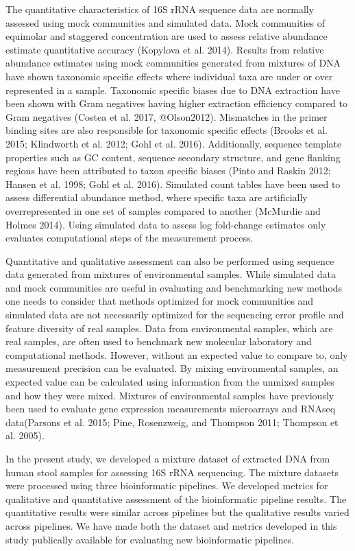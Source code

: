\documentclass[smallextended]{svjour3}       %
\begin{document}
The quantitative characteristics of 16S rRNA sequence data are normally
assessed using mock communities and simulated data. Mock communities of
equimolar and staggered concentration are used to assess relative
abundance estimate quantitative accuracy (Kopylova et al. 2014). Results
from relative abundance estimates using mock communities generated from
mixtures of DNA have shown taxonomic specific effects where individual
taxa are under or over represented in a sample. Taxonomic specific
biases due to DNA extraction have been shown with Gram negatives having
higher extraction efficiency compared to Gram negatives (Costea et al.
2017, @Olson2012). Mismatches in the primer binding sites are also
responsible for taxonomic specific effects (Brooks et al. 2015;
Klindworth et al. 2012; Gohl et al. 2016). Additionally, sequence
template properties such as GC content, sequence secondary structure,
and gene flanking regions have been attributed to taxon specific biases
(Pinto and Raskin 2012; Hansen et al. 1998; Gohl et al. 2016). Simulated
count tables have been used to assess differential abundance method,
where specific taxa are artificially overrepresented in one set of
samples compared to another (McMurdie and Holmes 2014). Using simulated
data to assess log fold-change estimates only evaluates computational
steps of the measurement process.

Quantitative and qualitative assessment can also be performed using
sequence data generated from mixtures of environmental samples. While
simulated data and mock communities are useful in evaluating and
benchmarking new methods one needs to consider that methods optimized
for mock communities and simulated data are not necessarily optimized
for the sequencing error profile and feature diversity of real samples.
Data from environmental samples, which are real samples, are often used
to benchmark new molecular laboratory and computational methods.
However, without an expected value to compare to, only measurement
precision can be evaluated. By mixing environmental samples, an expected
value can be calculated using information from the unmixed samples and
how they were mixed. Mixtures of environmental samples have previously
been used to evaluate gene expression measurements microarrays and
RNAseq data(Parsons et al. 2015; Pine, Rosenzweig, and Thompson 2011;
Thompson et al. 2005).

In the present study, we developed a mixture dataset of extracted DNA
from human stool samples for assessing 16S rRNA sequencing. The mixture
datasets were processed using three bioinformatic pipelines. We
developed metrics for qualitative and quantitative assessment of the
bioinformatic pipeline results. The quantitative results were similar
across pipelines but the qualitative results varied across pipelines. We
have made both the dataset and metrics developed in this study
publically available for evaluating new bioinformatic pipelines.
\end{document}
